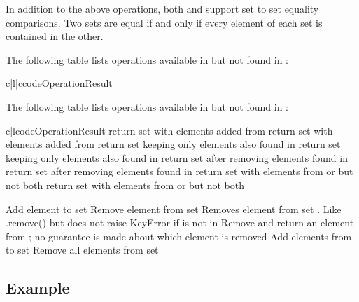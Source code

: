In addition to the above operations, both  and 
support set to set equality comparisons.  Two sets are equal if and only if
every element of each set is contained in the other.

The following table lists operations available in 
but not found in :

\begin{tableii}{c|l|c}{code}{Operation}{Result}
\end{tableii}

The following table lists operations available in 
but not found in :

\begin{tableii}{c|l}{code}{Operation}{Result}
         {return set  with elements added from }
         {return set  with elements added from }
         {return set  keeping only elements also found in }
         {return set  keeping only elements also found in }
         {return set  after removing elements found in }
         {return set  after removing elements found in }
         {return set  with elements from  or 
          but not both}
         {return set  with elements from  or 
          but not both}

  \hline
         {Add element  to set }
         {Remove element  from set }
         {Removes element  from set . Like .remove()
          but does not raise KeyError if  is not in }
         {Remove and return an element from ; no guarantee is
          made about which element is removed}
         {Add elements from  to set }
         {Remove all elements from set }
\end{tableii}


\subsection{Example}


